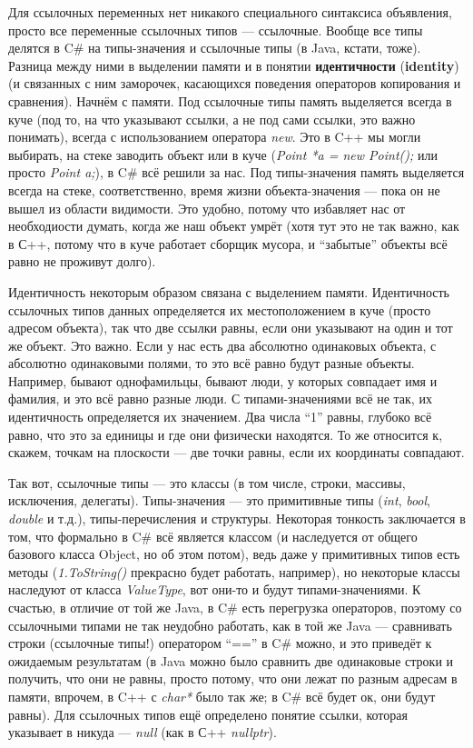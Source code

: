 \documentclass[a5paper]{article}
\begin{document}
Для ссылочных переменных нет никакого специального синтаксиса объявления, просто все переменные ссылочных типов --- ссылочные. Вообще все типы делятся в C\# на типы-значения и ссылочные типы (в Java, кстати, тоже). Разница между ними в выделении памяти и в понятии \textbf{идентичности} (\textbf{identity}) (и связанных с ним заморочек, касающихся поведения операторов копирования и сравнения). Начнём с памяти. Под ссылочные типы память выделяется всегда в куче (под то, на что указывают ссылки, а не под сами ссылки, это важно понимать), всегда с использованием оператора \textit{new}. Это в C++ мы могли выбирать, на стеке заводить объект или в куче (\textit{Point *a = new Point();} или просто \textit{Point a;}), в C\# всё решили за нас. Под типы-значения память выделяется всегда на стеке, соответственно, время жизни объекта-значения --- пока он не вышел из области видимости. Это удобно, потому что избавляет нас от необходиости думать, когда же наш объект умрёт (хотя тут это не так важно, как в С++, потому что в куче работает сборщик мусора, и ``забытые'' объекты всё равно не проживут долго).

Идентичность некоторым образом связана с выделением памяти. Идентичность ссылочных типов данных определяется их местоположением в куче (просто адресом объекта), так что две ссылки равны, если они указывают на один и тот же объект. Это важно. Если у нас есть два абсолютно одинаковых объекта, с абсолютно одинаковыми полями, то это всё равно будут разные объекты. Например, бывают однофамильцы, бывают люди, у которых совпадает имя и фамилия, и это всё равно разные люди. С типами-значениями всё не так, их идентичность определяется их значением. Два числа ``1'' равны, глубоко всё равно, что это за единицы и где они физически находятся. То же относится к, скажем, точкам на плоскости --- две точки равны, если их координаты совпадают.

Так вот, ссылочные типы --- это классы (в том числе, строки, массивы, исключения, делегаты). Типы-значения --- это примитивные типы (\textit{int}, \textit{bool}, \textit{double} и т.д.), типы-перечисления и структуры. Некоторая тонкость заключается в том, что формально в C\# всё является классом (и наследуется от общего базового класса Object, но об этом потом), ведь даже у примитивных типов есть методы (\textit{1.ToString()} прекрасно будет работать, например), но некоторые классы наследуют от класса \textit{ValueType}, вот они-то и будут типами-значениями. К счастью, в отличие от той же Java, в C\# есть перегрузка операторов, поэтому со ссылочными типами не так неудобно работать, как в той же Java --- сравнивать строки (ссылочные типы!) оператором ``=='' в C\# можно, и это приведёт к ожидаемым результатам (в Java можно было сравнить две одинаковые строки и получить, что они не равны, просто потому, что они лежат по разным адресам в памяти, впрочем, в C++ с \textit{char*} было так же; в C\# всё будет ок, они будут равны). Для ссылочных типов ещё определено понятие ссылки, которая указывает в никуда --- \textit{null} (как в С++ \textit{nullptr}).
\end{document}
